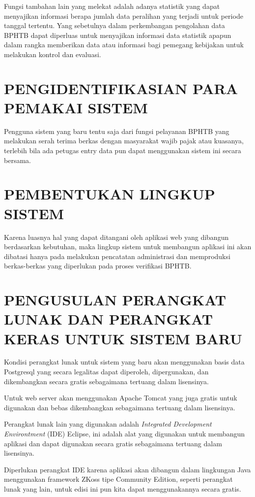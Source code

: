 \documentclass[pdftex,12pt, oneside]{article}
\begin{document}
Fungsi tambahan lain yang melekat adalah adanya statistik yang dapat menyajikan informasi berapa jumlah data peralihan yang terjadi untuk periode tanggal tertentu. Yang sebetulnya dalam perkembangan pengolahan data BPHTB dapat diperluas untuk menyajikan informasi data statistik apapun dalam rangka memberikan data atau informasi bagi pemegang kebijakan untuk melakukan kontrol dan evaluasi.

\section{PENGIDENTIFIKASIAN PARA PEMAKAI SISTEM}

Pengguna sistem yang baru tentu saja dari fungsi pelayanan BPHTB yang melakukan serah terima berkas dengan masyarakat wajib pajak atau kuasanya, terlebih bila ada petugas entry data pun dapat menggunakan sistem ini secara bersama.

\section{PEMBENTUKAN LINGKUP SISTEM}

Karena luasnya hal yang dapat ditangani oleh aplikasi web yang dibangun berdasarkan kebutuhan, maka lingkup sistem untuk membangun aplikasi ini akan dibatasi hanya pada melakukan pencatatan administrasi dan memproduksi berkas-berkas yang diperlukan pada proses verifikasi BPHTB.

\section{PENGUSULAN PERANGKAT LUNAK DAN PERANGKAT KERAS UNTUK SISTEM BARU}

Kondisi perangkat lunak untuk sistem yang baru akan menggunakan basis data Postgresql yang secara legalitas dapat diperoleh, dipergunakan, dan dikembangkan secara gratis sebagaimana tertuang dalam lisensinya.

Untuk web server akan menggunakan Apache Tomcat yang juga gratis untuk digunakan dan bebas dikembangkan sebagaimana tertuang dalam lisensinya.

Perangkat lunak lain yang digunakan adalah \textit{Integrated Development Environtment} (IDE) Eclipse, ini adalah alat yang digunakan untuk membangun aplikasi dan dapat digunakan secara gratis sebagaimana tertuang dalam lisensinya.

Diperlukan perangkat IDE karena aplikasi akan dibangun dalam lingkungan Java menggunakan framework ZKoss tipe Community Edition, seperti perangkat lunak yang lain, untuk edisi ini pun kita dapat menggunakannya secara gratis.
\end{document}
